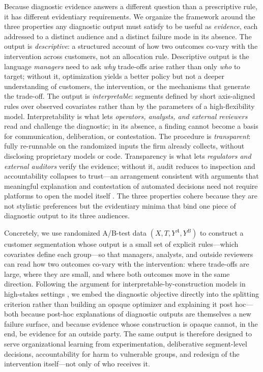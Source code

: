 \documentclass[11pt,letterpaper,english]{article}
\theoremstyle{definition}
\theoremstyle{definition}
\begin{document}
\begin{bibunit}
Because diagnostic evidence answers a different question than a prescriptive rule, it has different evidentiary requirements. We organize the framework around the three properties any diagnostic output must satisfy to be useful as \emph{evidence}, each addressed to a distinct audience and a distinct failure mode in its absence. The output is \emph{descriptive}: a structured account of how two outcomes co-vary with the intervention across customers, not an allocation rule. Descriptive output is the language \emph{managers} need to ask \emph{why} trade-offs arise rather than only \emph{who} to target; without it, optimization yields a better policy but not a deeper understanding of customers, the intervention, or the mechanisms that generate the trade-off. The output is \emph{interpretable}: segments defined by short axis-aligned rules over observed covariates rather than by the parameters of a high-flexibility model. Interpretability is what lets \emph{operators, analysts, and external reviewers} read and challenge the diagnostic; in its absence, a finding cannot become a basis for communication, deliberation, or contestation. The procedure is \emph{transparent}: fully re-runnable on the randomized inputs the firm already collects, without disclosing proprietary models or code. Transparency is what lets \emph{regulators and external auditors} verify the evidence; without it, audit reduces to inspection and accountability collapses to trust---an arrangement consistent with arguments that meaningful explanation and contestation of automated decisions need not require platforms to open the model itself \citep{wachter2017counterfactual}. The three properties cohere because they are not stylistic preferences but the evidentiary minima that bind one piece of diagnostic output to its three audiences.

Concretely, we use randomized A/B-test data $(X, T, Y^A, Y^B)$ to construct a customer segmentation whose output is a small set of explicit rules---which covariates define each group---so that managers, analysts, and outside reviewers can read how two outcomes co-vary with the intervention: where trade-offs are large, where they are small, and where both outcomes move in the same direction. Following the argument for interpretable-by-construction models in high-stakes settings \citep{rudin2019stop}, we embed the diagnostic objective directly into the splitting criterion rather than building an opaque optimizer and explaining it post hoc---both because post-hoc explanations of diagnostic outputs are themselves a new failure surface, and because evidence whose construction is opaque cannot, in the end, be evidence for an outside party. The same output is therefore designed to serve organizational learning from experimentation, deliberative segment-level decisions, accountability for harm to vulnerable groups, and redesign of the intervention itself---not only of who receives it.


\end{bibunit}
\end{document}
